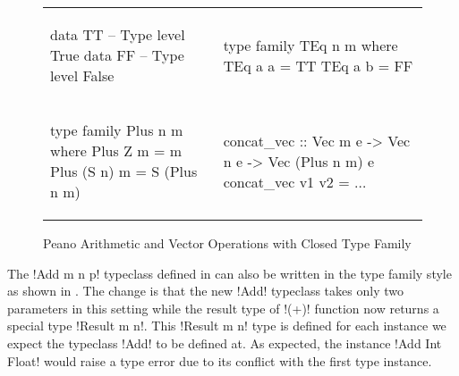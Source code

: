 \documentclass[format=acmsmall,manuscript,review,screen,nonacm,margin=1in,11pt]{acmart}
\begin{document}
\begin{figure}[ht]
    \footnotesize
  \begin{tabular}{l l}
\begin{code}
data TT -- Type level True
data FF -- Type level False
\end{code}&%
\begin{code}
type family TEq n m where
  TEq a a = TT
  TEq a b = FF
\end{code}\\
\begin{code}
type family Plus n m where
Plus Z     m = m
Plus (S n) m = S (Plus n m)
\end{code}&%
\begin{code}
concat_vec :: Vec m e -> Vec n e
           -> Vec (Plus n m) e
concat_vec v1 v2 = $\ldots$
\end{code}
  \end{tabular}
  \caption{Peano Arithmetic and Vector Operations with Closed Type Family}
  \label{fig:plus-ty-fam}
\end{figure}
The !Add m n p! typeclass defined in  can also be written in
the type family style as shown in . The change is that the new 
!Add! typeclass takes only two parameters in this setting while the result type
of !(+)! function now returns a special type !Result m n!. This !Result m n! type is defined
for each instance we expect the typeclass !Add! to be defined at.
As expected, the instance !Add Int Float! would raise a type error due to its conflict with
the first type instance. 

\end{document}
